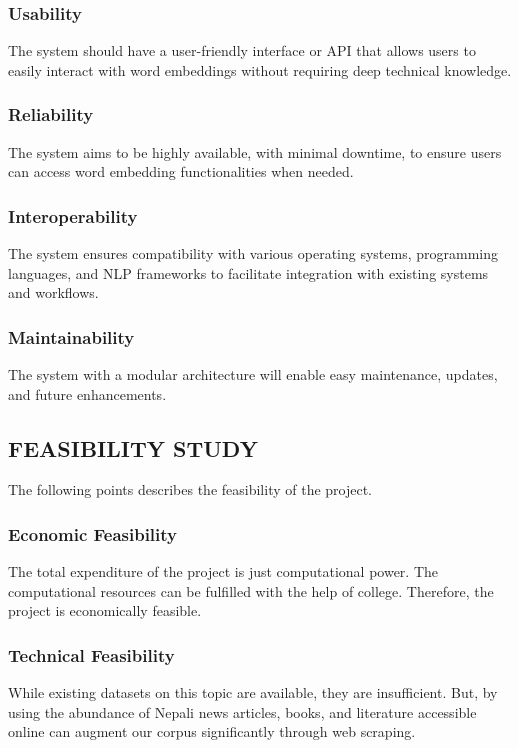             \subsubsection{Usability}            
            The system should have a user-friendly interface or API that allows users to easily interact with word embeddings without requiring deep technical knowledge.

            \subsubsection{Reliability}
            The system aims to be highly available, with minimal downtime, to ensure users can access word embedding functionalities when needed.

            \subsubsection{Interoperability}
            The system ensures compatibility with various operating systems, programming languages, and NLP frameworks to facilitate integration with existing systems and workflows.

            \subsubsection{Maintainability}            
            The system with a modular architecture will enable easy maintenance, updates, and future enhancements.


        \subsection{FEASIBILITY STUDY}
            The following points describes the feasibility of the project.

            \subsubsection{Economic Feasibility}
                The total expenditure of the project is just computational power. The computational resources can be fulfilled with the help of college. Therefore, the project is economically feasible.

            \subsubsection{Technical Feasibility}
                While existing datasets on this topic are available, they are insufficient. But, by using the abundance of Nepali news articles, books, and literature accessible online can augment our corpus significantly through web scraping.

